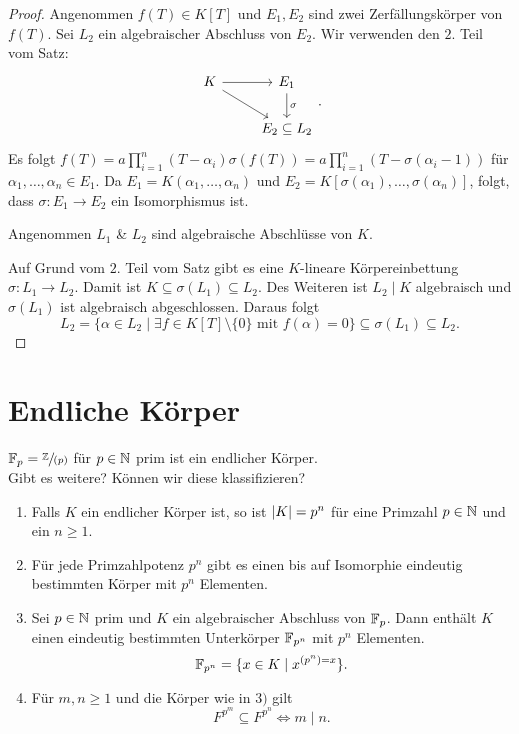 \begin{proof}
	Angenommen $f(T) \in K[T]$ und $E_1,E_2$ sind zwei Zerfällungskörper von $f(T)$.
	Sei $L_2$ ein algebraischer Abschluss von $E_2$. Wir verwenden den $2.$ Teil vom Satz:
	\[
		\begin{tikzcd}
			K \arrow[r] \arrow[rd] & E_1 \arrow[d, "\sigma"] \\
                       & E_2 \subseteq L_2      
		\end{tikzcd}
	.\] 
	Es folgt $f(T) = a \prod_{i=1}^{n} (T-\alpha_{i}) \sigma(f(T)) = a \prod_{i=1}^{n} (T - \sigma(\alpha_{i} -1))$ für $\alpha_1,\ldots,\alpha_{n} \in E_1$.
	Da $E_1 = K(\alpha_1,\ldots,\alpha_{n})$ und $E_2 = K[\sigma(\alpha_1),\ldots, \sigma(\alpha_{n})]$, folgt, dass $\sigma: E_1 \to E_2$ ein
	Isomorphismus ist.

	Angenommen $L_1$ \& $L_2$ sind algebraische Abschlüsse von $K$.

	Auf Grund vom $2.$ Teil vom Satz gibt es eine $K$-lineare Körpereinbettung $\sigma: L_1 \to L_2$.
	Damit ist $K \subseteq \sigma(L_1) \subseteq L_2$. Des Weiteren ist $L_2 \mid K$ algebraisch und $\sigma(L_1)$ ist
	algebraisch abgeschlossen. Daraus folgt
	\[
		L_2 = \{\alpha \in L_2 \mid \exists f \in K[T] \setminus \{0\} \text{ mit } f(\alpha) = 0\} \subseteq \sigma(L_1) \subseteq L_2 
	.\] 
\end{proof}

\section{Endliche Körper}
$\mathbb{F}_{p} = \sfrac{\mathbb{Z}}{(p)}$ für $p \in \mathbb{N}$ prim ist ein endlicher Körper.\\
Gibt es weitere? Können wir diese klassifizieren?

\begin{theorem}
	\begin{enumerate}
		\item Falls $K$ ein endlicher Körper ist, so ist $\abs{K} = p^{n}$ für eine Primzahl $p \in \mathbb{N}$ und ein $n \geq 1$.
		\item Für jede Primzahlpotenz $p^{n}$ gibt es einen bis auf Isomorphie eindeutig bestimmten Körper mit $p^{n}$ Elementen.
		\item Sei $p \in \mathbb{N}$ prim und $K$ ein algebraischer Abschluss von $\mathbb{F}_{p}$. Dann enthält $K$ einen eindeutig bestimmten
			Unterkörper $\mathbb{F}_{p^{n}}$ mit $p^{n}$ Elementen.
			\[
				\mathbb{F}_{p^{n}} = \{x \in K \mid x^{\left( p^{n} \right) = x}\} 
			.\] 
		\item Für $m,n \geq 1$ und die Körper wie in $3)$ gilt
			\[
			F^{p^{m}} \subseteq F^{p^{n}} \Leftrightarrow m \mid n
			.\] 
	\end{enumerate}
\end{theorem}

